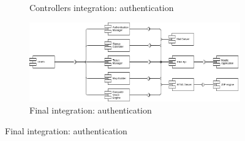 \documentclass{article}
\begin{document}
\begin{figure}[h]
\begin{subfigure}[H]{\linewidth}
			\caption{Controllers integration: authentication}
		\end{subfigure}
		\begin{subfigure}[H]{\linewidth}
			\includegraphics[width=\linewidth]{images/integrationAuthentication_6.png}
			\caption{Final integration: authentication}
		\end{subfigure}
	\end{figure}
\end{document}

